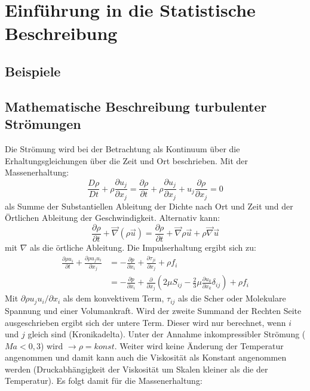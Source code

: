 \section{Einführung in die Statistische Beschreibung}
\label{sec:StatistischeBeschreibung}
\subsection{Beispiele}
\subsection{Mathematische Beschreibung turbulenter Strömungen}
Die Strömung wird bei der Betrachtung als Kontinuum über die Erhaltungsgleichungen über die Zeit und Ort beschrieben. Mit der Massenerhaltung:
\begin{equation}
	\frac{D \rho}{D t}+\rho \frac{\partial u_{j}}{\partial x_{j}}=\frac{\partial \rho}{\partial t}+\rho \frac{\partial u_{j}}{\partial x_{j}}+u_{j} \frac{\partial \rho}{\partial x_{j}}=0
\end{equation}
als Summe der Substantiellen Ableitung der Dichte nach Ort und Zeit und der Örtlichen Ableitung der Geschwindigkeit. Alternativ kann:
\begin{equation}
	\frac{\partial \rho}{\partial t} + \vec{\nabla}(\rho \vec{u}) =  \frac{\partial \rho}{\partial t} + \vec{\nabla} \rho \vec{u} + \rho \vec{\nabla}\vec{u}
\end{equation}
mit $\nabla$ als die örtliche Ableitung. Die Impulserhaltung ergibt sich zu:
\begin{equation}
	\label{eq: ImpulsmitS_ij}
	\begin{aligned}
		\frac{\partial \rho u_{i}}{\partial t}+\frac{\partial \rho u_{j} u_{i}}{\partial x_{j}} &=-\frac{\partial p}{\partial x_{i}}+\frac{\partial \tau_{j i}}{\partial x_{j}}+\rho f_{i} \\
		&=-\frac{\partial p}{\partial x_{i}}+\frac{\partial}{\partial x_{j}}\left(2 \mu S_{i j}-\frac{2}{3} \mu \frac{\partial u_{k}}{\partial x_{k}} \delta_{i j}\right)+\rho f_{i}
	\end{aligned}
\end{equation}
Mit $\partial \rho u_{j} u_{i}/\partial x_i$ als dem konvektivem Term, $\tau_{ij}$ als die Scher oder Molekulare Spannung und einer Volumankraft. Wird der zweite Summand der Rechten Seite ausgeschrieben ergibt sich der untere Term. %
Dieser wird nur berechnet, wenn $i$ und $j$ gleich sind (Kronikadelta).
Unter der Annahme inkompressibler Strömung ($Ma <0,3$) wird $\rightarrow \rho = konst.$ Weiter wird keine Änderung der Temperatur angenommen und damit kann auch die Viskosität  als Konstant angenommen werden (Druckabhängigkeit der Viskosität um Skalen kleiner als die der Temperatur). Es folgt damit für die Massenerhaltung: 
